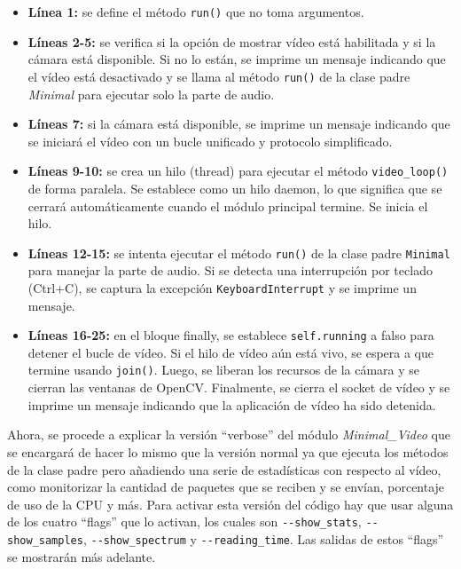 \begin{itemize}
    \item \textbf{Línea 1:} se define el método \texttt{run()} que no toma argumentos.
    \item \textbf{Líneas 2-5:} se verifica si la opción de mostrar vídeo está habilitada y si la cámara está disponible. Si no lo están, se imprime un mensaje indicando que el vídeo está desactivado y se llama al método \texttt{run()} de la clase padre \textit{Minimal} para ejecutar solo la parte de audio.
    \item \textbf{Líneas 7:} si la cámara está disponible, se imprime un mensaje indicando que se iniciará el vídeo con un bucle unificado y protocolo simplificado.
    \item \textbf{Líneas 9-10:} se crea un hilo (thread) para ejecutar el método \texttt{video\_loop()} de forma paralela. Se establece como un hilo daemon, lo que significa que se cerrará automáticamente cuando el módulo principal termine. Se inicia el hilo.
    \item \textbf{Líneas 12-15:} se intenta ejecutar el método \texttt{run()} de la clase padre \texttt{Minimal} para manejar la parte de audio. Si se detecta una interrupción por teclado (Ctrl+C), se captura la excepción \texttt{KeyboardInterrupt} y se imprime un mensaje.
    \item \textbf{Líneas 16-25:} en el bloque finally, se establece \texttt{self.running} a falso para detener el bucle de vídeo. Si el hilo de vídeo aún está vivo, se espera a que termine usando \texttt{join()}. Luego, se liberan los recursos de la cámara y se cierran las ventanas de OpenCV. Finalmente, se cierra el socket de vídeo y se imprime un mensaje indicando que la aplicación de vídeo ha sido detenida.
\end{itemize}

\vspace{\baselineskip}

Ahora, se procede a explicar la versión ``verbose'' del módulo \textit{Minimal\_Video} que se encargará de hacer lo mismo que la versión normal ya que ejecuta los métodos de la clase padre pero añadiendo una serie de estadísticas con respecto al vídeo, como monitorizar la cantidad de paquetes que se reciben y se envían, porcentaje de uso de la CPU y más. Para activar esta versión del código hay que usar alguna de los cuatro ``flags'' que lo activan, los cuales son \verb|--show_stats|, \verb|--show_samples|, \verb|--show_spectrum| y \verb|--reading_time|. Las salidas de estos ``flags'' se mostrarán más adelante. 
\vspace{\baselineskip}

